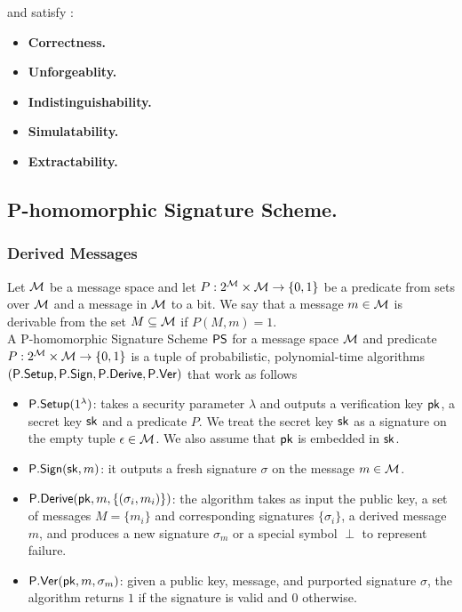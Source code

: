 \documentclass[11pt]{llncs}
\begin{document}
and satisfy :

\begin{itemize}

\item \textbf{Correctness.} 
\item \textbf{Unforgeablity.}
\item \textbf{Indistinguishability.}
\item \textbf{Simulatability.} 
\item \textbf{Extractability.}
\end{itemize}


\subsection{P-homomorphic Signature Scheme.} %

\subsubsection{Derived Messages}
Let ${\cal M}$ be a message space and let $P: 2^{{\cal M}} \times {\cal M} \to \{0,1\}$ be
a predicate from sets over ${\cal M}$ and a message in
${\cal M}$ to a bit. We say that a message $m \in {\cal M}$
is derivable from the set $M \subseteq {\cal M}$ if $P(M,m) = 1$. \\


A P-homomorphic Signature Scheme ${\sf PS}$ for a message space ${\cal M}$ and predicate
$P: 2^{{\cal M}} \times {\cal M} \to \{0,1\}$ is a tuple of probabilistic, polynomial-time algorithms
$({\sf P.Setup}, {\sf P.Sign}, {\sf P.Derive}, {\sf P.Ver})$ that work as follows
\begin{itemize}
\item ${\sf P.Setup}(1^\lambda)$: takes a security parameter $\lambda$ and outputs a 
verification key ${\sf pk}$, a secret key ${\sf sk}$ and a predicate $P$.
We treat the secret key ${\sf sk}$ as a signature on the empty tuple $\epsilon \in {\cal M}$.
We also assume that ${\sf pk}$ is embedded in ${\sf sk}$.


\item ${\sf P.Sign}({\sf sk}, m)$: it outputs a fresh signature $\sigma$ on the message $m \in {\cal M}$.

\item ${\sf P.Derive}({\sf pk}, m, \lbrace (\sigma_i, m_i) \rbrace)$: the algorithm takes as input the public key, a set of messages $M= \lbrace m_i \rbrace$ and corresponding signatures $\lbrace \sigma_i \rbrace$, a derived message $m$, and produces a new signature $\sigma_m$ or a special symbol $\perp$ to represent failure. 

\item ${\sf P.Ver}({\sf pk}, m, \sigma_m)$: given a public key, message, and purported signature $\sigma$, the algorithm returns $1$
if the signature is valid and $0$ otherwise.
\end{itemize}
\end{document}
